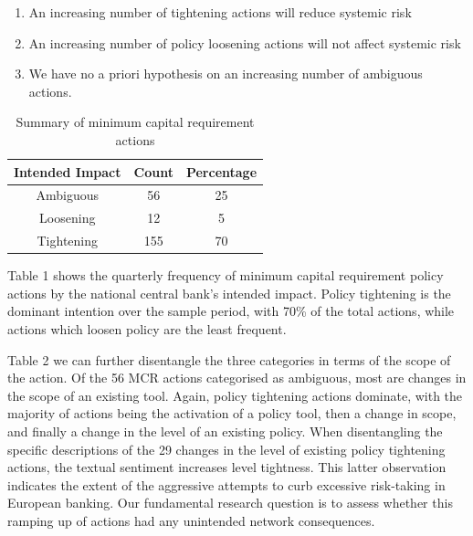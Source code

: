 \documentclass[
  10pt,
]{article}
\providecommand{\tightlist}{%
  \setlength{\itemsep}{0pt}\setlength{\parskip}{0pt}}
\begin{document}
\begin{enumerate}
\def\labelenumi{\arabic{enumi}.}
\tightlist
\item
  An increasing number of tightening actions will reduce systemic risk
\item
  An increasing number of policy loosening actions will not affect
  systemic risk
\item
  We have no a priori hypothesis on an increasing number of ambiguous
  actions.
\end{enumerate}

\begin{table}[H]

\caption{\label{tab:mcr}Summary of minimum capital requirement actions}
\centering
\begin{tabular}[t]{ccc}
\toprule
Intended Impact & Count & Percentage\\
\midrule
Ambiguous & 56 & 25\\
Loosening & 12 & 5\\
Tightening & 155 & 70\\
\bottomrule
\end{tabular}
\end{table}

Table 1 shows the quarterly frequency of minimum capital requirement
policy actions by the national central bank's intended impact. Policy
tightening is the dominant intention over the sample period, with 70\%
of the total actions, while actions which loosen policy are the least
frequent.

\begin{table}[H]

\caption{\label{tab:action types}Type of action of policy tool}
\centering
{}
\end{table}

Table 2 we can further disentangle the three categories in terms of the
scope of the action. Of the 56 MCR actions categorised as ambiguous,
most are changes in the scope of an existing tool. Again, policy
tightening actions dominate, with the majority of actions being the
activation of a policy tool, then a change in scope, and finally a
change in the level of an existing policy. When disentangling the
specific descriptions of the 29 changes in the level of existing policy
tightening actions, the textual sentiment increases level tightness.
This latter observation indicates the extent of the aggressive attempts
to curb excessive risk-taking in European banking. Our fundamental
research question is to assess whether this ramping up of actions had
any unintended network consequences.
\end{document}

